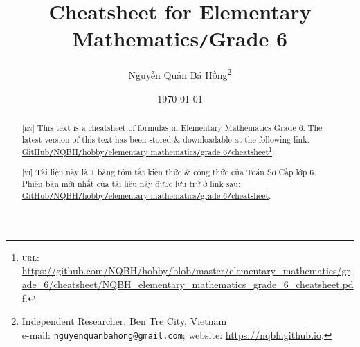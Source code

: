 \documentclass{article}
\title{Cheatsheet for Elementary Mathematics\texttt{/}Grade 6}
\author{\selectlanguage{vietnamese} Nguyễn Quản Bá Hồng\footnote{Independent Researcher, Ben Tre City, Vietnam\\e-mail: \texttt{nguyenquanbahong@gmail.com}; website: \url{https://nqbh.github.io}.}}
\date{\today}
\numberwithin{equation}{section}
\begin{document}
\maketitle
{}
\begin{abstract}
	\textsc{[en]} This text is a cheatsheet of formulas in Elementary Mathematics Grade 6. The latest version of this text has been stored \& downloadable at the following link: \href{https://github.com/NQBH/hobby/blob/master/elementary_mathematics/grade_6/cheatsheet/NQBH_elementary_mathematics_grade_6_cheatsheet.pdf}{GitHub\texttt{/}NQBH\texttt{/}hobby\texttt{/}elementary mathematics\texttt{/}grade 6\texttt{/}cheatsheet}\footnote{\textsc{url}: \url{https://github.com/NQBH/hobby/blob/master/elementary_mathematics/grade_6/cheatsheet/NQBH_elementary_mathematics_grade_6_cheatsheet.pdf}.}.
	\vspace{2mm}

	\textsc{[vi]} Tài liệu này là 1 bảng tóm tắt kiến thức \& công thức của Toán Sơ Cấp lớp 6. Phiên bản mới nhất của tài liệu này được lưu trữ ở link sau: \href{https://github.com/NQBH/hobby/blob/master/elementary_mathematics/grade_6/cheatsheet/NQBH_elementary_mathematics_grade_6_cheatsheet.pdf}{GitHub\texttt{/}NQBH\texttt{/}hobby\texttt{/}elementary mathematics\texttt{/}grade 6\texttt{/}cheatsheet}.
\end{abstract}
\tableofcontents
\newpage

\end{document}
